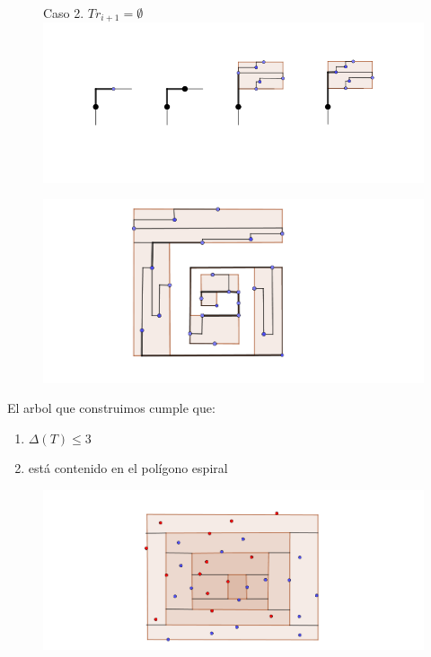 \documentclass{beamer}
\begin{document}
\begin{frame}
\begin{figure}[h]
Caso 2. $Tr_{i+1} = \emptyset$
\includegraphics[width=\textwidth]{Caso-2}
\end{figure}
\end{frame}
\begin{frame}
\begin{figure}[h]
\includegraphics[width=\textwidth]{Poligono-con-planos-6}
\end{figure}
\end{frame}
\begin{frame}
El arbol que construimos cumple que:
\begin{enumerate}
\item $\Delta (T) \leq 3$
\item está contenido en el polígono espiral
\end{enumerate}
\end{frame}
\begin{frame}
\begin{figure}[h]
\includegraphics[width=\textwidth]{Construccion-poligono-2-alternancia}
\end{figure}
\end{frame}
\end{document}
